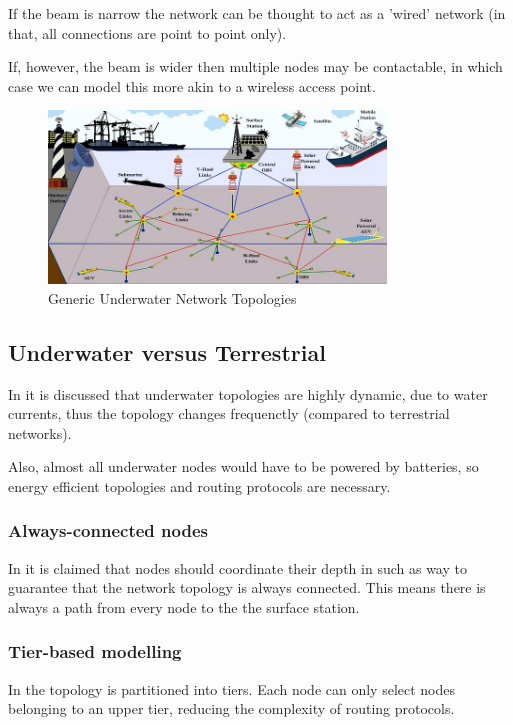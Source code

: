 If the beam is narrow the network can be thought to act as a 'wired' network
(in that, all connections are point to point only).

If, however, the beam is wider then multiple nodes may be contactable, in which
case we can model this more akin to a wireless access point.


\begin{figure}[H]
  \includegraphics[width=0.8\textwidth]{underwater_network_topologies_v2.jpg}
  \caption{Generic Underwater Network Topologies}
  \label{fig:underwater_network_topologies_v2}
\end{figure}

\subsection{Underwater versus Terrestrial}
In \cite{s16030414} it is discussed that underwater topologies are highly
dynamic, due to water currents, thus the topology changes frequenctly
(compared to terrestrial networks).

Also, almost all underwater nodes would have to be powered by batteries,
so energy efficient topologies and routing protocols are necessary.

\subsubsection{Always-connected nodes}
In \cite{POMPILI2009778} it is claimed that nodes should coordinate their
depth in such as way to guarantee that the network topology is always connected.
This means there is always a path from every node to the the surface station.

\subsubsection{Tier-based modelling}
In \cite{tier_based_underwater_routing} the topology is partitioned into tiers.
Each node can only select nodes belonging to an upper tier, reducing the
complexity of routing protocols.